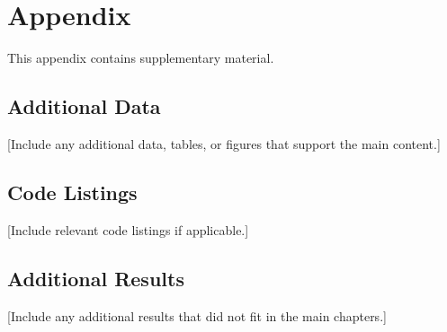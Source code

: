 \appendix

\chapter{Appendix}
\label{ch:appendix}

This appendix contains supplementary material.

\section{Additional Data}
\label{sec:additional-data}

[Include any additional data, tables, or figures that support the main content.]

\section{Code Listings}
\label{sec:code-listings}

[Include relevant code listings if applicable.]

\section{Additional Results}
\label{sec:additional-results}

[Include any additional results that did not fit in the main chapters.]
